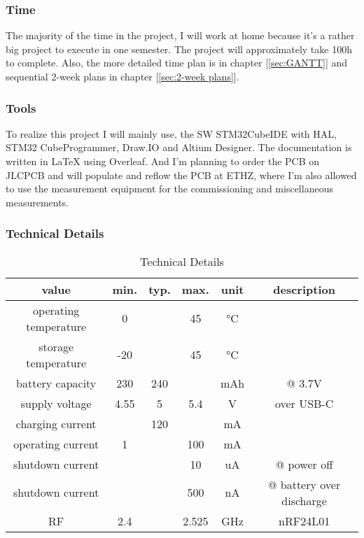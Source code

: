 \subsubsection{Time}
The majority of the time in the project, I will work at home because it's a rather big project to execute in one semester. The project will approximately take 100h to complete. Also, the more detailed time plan is in chapter [\ref{sec:GANTT}] and sequential 2-week plans in chapter [\ref{sec:2-week plans}].

\subsubsection{Tools}
To realize this project I will mainly use, the SW STM32CubeIDE with HAL, STM32 CubeProgrammer, Draw.IO and Altium Designer. The documentation is written in LaTeX using Overleaf. And I'm planning to order the PCB on JLCPCB and will populate and reflow the PCB at ETHZ, where I'm also allowed to use the measurement equipment for the commissioning and miscellaneous measurements.

\subsubsection{Technical Details}
\begin{table}[H]
    \centering
    \label{tab:Technical Details}
\begin{tabular}{||c || c | c | c | c  || c ||} 
 \hline
 value &  min. & typ. & max. & unit & description \\ [0.5ex] 
 \hline\hline
 operating temperature & 0 & & 45 & °C & \\ 
 \hline
storage temperature & -20 & & 45 & °C & \\ 
 \hline
  battery capacity & 230 & 240 & & mAh & @ 3.7V \\ 
 \hline
  supply voltage & 4.55 & 5 & 5.4 & V & over USB-C \\ 
 \hline
  charging current & & 120 & & mA & \\ 
 \hline
  operating current & 1 & & 100 & mA & \\ 
 \hline
  shutdown current & & & 10 & uA & @ power off \\ 
 \hline
  shutdown current & & & 500 & nA & @ battery over discharge \\ 
 \hline
  RF & 2.4 & & 2.525 & GHz & nRF24L01 \\ 
 \hline
\end{tabular}
    \caption{Technical Details}
\end{table}

\newpage